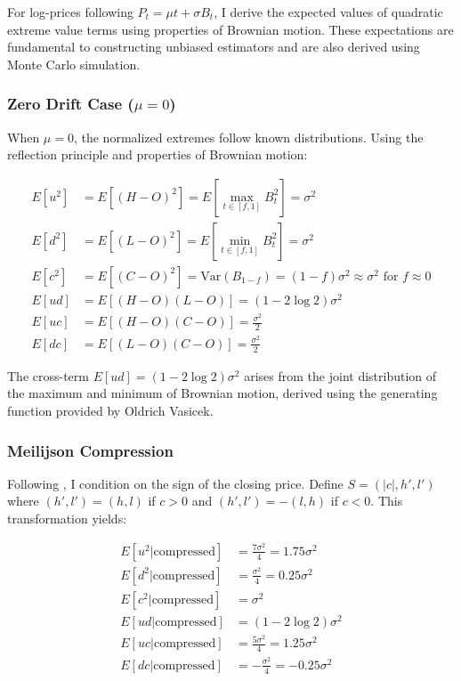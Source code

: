 For log-prices following $P_t = \mu t + \sigma B_t$, I derive the expected values of quadratic extreme value terms using properties of Brownian motion. These expectations are fundamental to constructing unbiased estimators and are also derived using Monte Carlo simulation.

\subsubsection{Zero Drift Case ($\mu = 0$)}

When $\mu = 0$, the normalized extremes follow known distributions. Using the reflection principle and properties of Brownian motion:

\begin{align}
E[u^2] &= E[(H - O)^2] = E[\max_{t \in [f,1]} B_t^2] = \sigma^2 \\
E[d^2] &= E[(L - O)^2] = E[\min_{t \in [f,1]} B_t^2] = \sigma^2 \\
E[c^2] &= E[(C - O)^2] = \text{Var}(B_{1-f}) = (1-f)\sigma^2 \approx \sigma^2 \text{ for } f \approx 0 \\
E[ud] &= E[(H - O)(L - O)] = (1 - 2\log 2)\sigma^2 \\
E[uc] &= E[(H - O)(C - O)] = \frac{\sigma^2}{2} \\
E[dc] &= E[(L - O)(C - O)] = \frac{\sigma^2}{2}
\end{align}

The cross-term $E[ud] = (1 - 2\log 2)\sigma^2$ arises from the joint distribution of the maximum and minimum of Brownian motion, derived using the generating function provided by Oldrich Vasicek.

\subsubsection{Meilijson Compression}

Following \citet{meilijson2009GarmanKlassVolatilityEstimator}, I condition on the sign of the closing price. Define $S = (|c|, h', l')$ where $(h', l') = (h, l)$ if $c > 0$ and $(h', l') = -(l, h)$ if $c < 0$. This transformation yields:

\begin{align}
E[u^2 | \text{compressed}] &= \frac{7\sigma^2}{4} = 1.75\sigma^2 \\
E[d^2 | \text{compressed}] &= \frac{\sigma^2}{4} = 0.25\sigma^2 \\
E[c^2 | \text{compressed}] &= \sigma^2 \\
E[ud | \text{compressed}] &= (1 - 2\log 2)\sigma^2 \\
E[uc | \text{compressed}] &= \frac{5\sigma^2}{4} = 1.25\sigma^2 \\
E[dc | \text{compressed}] &= -\frac{\sigma^2}{4} = -0.25\sigma^2
\end{align}

